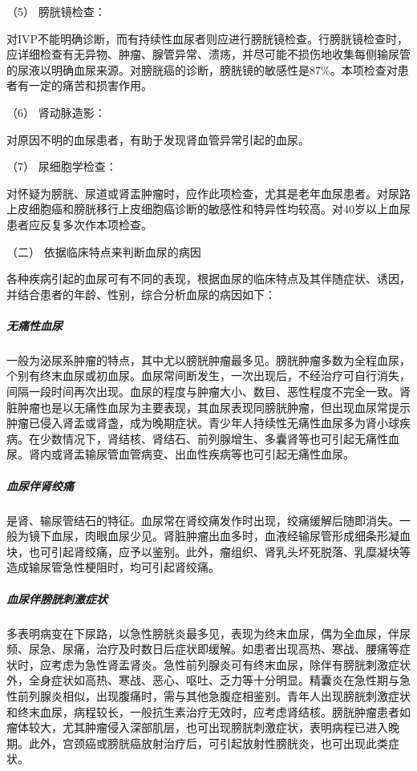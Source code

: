 \hypertarget{text00037.htmlux5cux23CHP1-15-2-4-1-2-5}{}
（5） 膀胱镜检查：

对IVP不能明确诊断，而有持续性血尿者则应进行膀胱镜检查。行膀胱镜检查时，应详细检查有无异物、肿瘤、腺管异常、溃疡，并尽可能不损伤地收集每侧输尿管的尿液以明确血尿来源。对膀胱癌的诊断，膀胱镜的敏感性是87\%。本项检查对患者有一定的痛苦和损害作用。

\hypertarget{text00037.htmlux5cux23CHP1-15-2-4-1-2-6}{}
（6） 肾动脉造影：

对原因不明的血尿患者，有助于发现肾血管异常引起的血尿。

\hypertarget{text00037.htmlux5cux23CHP1-15-2-4-1-2-7}{}
（7） 尿细胞学检查：

对怀疑为膀胱、尿道或肾盂肿瘤时，应作此项检查，尤其是老年血尿患者。对尿路上皮细胞癌和膀胱移行上皮细胞癌诊断的敏感性和特异性均较高。对40岁以上血尿患者应反复多次作本项检查。

\hypertarget{text00037.htmlux5cux23CHP1-15-2-4-2}{}
（二） 依据临床特点来判断血尿的病因

各种疾病引起的血尿可有不同的表现，根据血尿的临床特点及其伴随症状、诱因，并结合患者的年龄、性别，综合分析血尿的病因如下：

\subparagraph{无痛性血尿}

一般为泌尿系肿瘤的特点，其中尤以膀胱肿瘤最多见。膀胱肿瘤多数为全程血尿，个别有终末血尿或初血尿。血尿常间断发生，一次出现后，不经治疗可自行消失，间隔一段时间再次出现。血尿的程度与肿瘤大小、数目、恶性程度不完全一致。肾脏肿瘤也是以无痛性血尿为主要表现，其血尿表现同膀胱肿瘤，但出现血尿常提示肿瘤已侵入肾盂或肾盏，成为晚期症状。青少年人持续性无痛性血尿多为肾小球疾病。在少数情况下，肾结核、肾结石、前列腺增生、多囊肾等也可引起无痛性血尿。肾内或肾盂输尿管血管病变、出血性疾病等也可引起无痛性血尿。

\subparagraph{血尿伴肾绞痛}

是肾、输尿管结石的特征。血尿常在肾绞痛发作时出现，绞痛缓解后随即消失。一般为镜下血尿，肉眼血尿少见。肾脏肿瘤出血多时，血液经输尿管形成细条形凝血块，也可引起肾绞痛，应予以鉴别。此外，瘤组织、肾乳头坏死脱落、乳糜凝块等造成输尿管急性梗阻时，均可引起肾绞痛。

\subparagraph{血尿伴膀胱刺激症状}

多表明病变在下尿路，以急性膀胱炎最多见，表现为终末血尿，偶为全血尿，伴尿频、尿急、尿痛，治疗及时数日后症状即缓解。如患者出现高热、寒战、腰痛等症状时，应考虑为急性肾盂肾炎。急性前列腺炎可有终末血尿，除伴有膀胱刺激症状外，全身症状如高热、寒战、恶心、呕吐、乏力等十分明显。精囊炎在急性期与急性前列腺炎相似，出现腹痛时，需与其他急腹症相鉴别。青年人出现膀胱刺激症状和终末血尿，病程较长，一般抗生素治疗无效时，应考虑肾结核。膀胱肿瘤患者如瘤体较大，尤其肿瘤侵入深部肌层，也可出现膀胱刺激症状，表明病程已进入晚期。此外，宫颈癌或膀胱癌放射治疗后，可引起放射性膀胱炎，也可出现此类症状。

